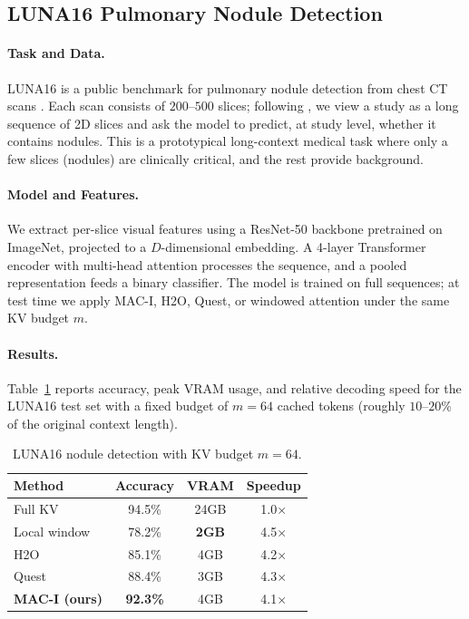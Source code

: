 \documentclass{article}
\theoremstyle{plain}
\theoremstyle{definition}
\theoremstyle{remark}
\begin{document}
\subsection{LUNA16 Pulmonary Nodule Detection}
\label{sec:exp_luna}

\paragraph{Task and Data.}
LUNA16 is a public benchmark for pulmonary nodule detection from chest CT scans
\citep{setio2017validation}. Each scan consists of $200$--$500$ slices; following
\citet{moor2023foundation}, we view a study as a long sequence of 2D slices and ask the
model to predict, at study level, whether it contains nodules. This is a prototypical
long-context medical task where only a few slices (nodules) are clinically critical, and
the rest provide background.

\paragraph{Model and Features.}
We extract per-slice visual features using a ResNet-50 backbone pretrained on ImageNet,
projected to a $D$-dimensional embedding. A 4-layer Transformer encoder with multi-head
attention processes the sequence, and a pooled representation feeds a binary classifier.
The model is trained on full sequences; at test time we apply MAC-I, H2O, Quest, or
windowed attention under the same KV budget $m$.

\paragraph{Results.}
Table~\ref{tab:luna} reports accuracy, peak VRAM usage, and relative decoding speed for
the LUNA16 test set with a fixed budget of $m=64$ cached tokens (roughly $10$–$20\%$ of
the original context length).

\begin{table}[h]
\caption{LUNA16 nodule detection with KV budget $m=64$.}
\label{tab:luna}
\begin{center}
\begin{small}
\begin{sc}
\begin{tabular}{lccc}
\toprule
Method & Accuracy & VRAM & Speedup \\
\midrule
Full KV             & 94.5\% & 24GB & 1.0$\times$ \\
Local window        & 78.2\% & \textbf{2GB} & 4.5$\times$ \\
H2O \citep{zhang2024h2o}   & 85.1\% & 4GB  & 4.2$\times$ \\
Quest \citep{tang2024quest} & 88.4\% & 3GB  & 4.3$\times$ \\
\textbf{MAC-I (ours)} & \textbf{92.3\%} & 4GB  & 4.1$\times$ \\
\bottomrule
\end{tabular}
\end{sc}
\end{small}
\end{center}
\vspace{-8pt}
\end{table}
\end{document}
